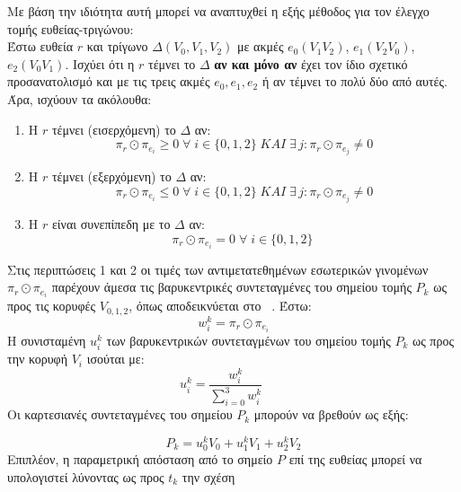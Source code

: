Με βάση την ιδιότητα αυτή μπορεί να αναπτυχθεί η εξής μέθοδος για τον έλεγχο τομής ευθείας-τριγώνου:\\

Έστω ευθεία $r$ και τρίγωνο $\Delta(V_0,V_1,V_2)$ με ακμές $e_0(V_1V_2)$, $e_1(V_2V_0)$, $e_2(V_0V_1)$. Ισχύει ότι η $r$ τέμνει το $\Delta$ \textbf{αν και μόνο αν} έχει τον ίδιο σχετικό προσανατολισμό και με τις τρεις ακμές $e_0,e_1,e_2$ ή αν τέμνει το πολύ δύο από αυτές. Άρα, ισχύουν τα ακόλουθα:

\begin{enumerate}
\item
Η $r$ τέμνει (εισερχόμενη) το $\Delta$ αν: \begin{equation*}\pi_r \odot \pi_{e_{i}} \geq 0\; \forall\; i\in \{0,1,2\}\; KAI \; \exists \,j : \pi_r \odot \pi_{e_{j}} \neq 0\end{equation*}
\item
Η $r$ τέμνει (εξερχόμενη) το $\Delta$ αν:\begin{equation*}\pi_r \odot \pi_{e_{i}} \leq 0\; \forall\; i\in \{0,1,2\}\;  KAI \; \exists \,j : \pi_r \odot \pi_{e_{j}} \neq 0 \end{equation*}
\item
Η $r$ είναι συνεπίπεδη με το $\Delta$ αν: \begin{equation}\pi_r \odot \pi_{e_{i}}= 0 \;\forall\; i\in \{0,1,2\}\; \label{eq:crit}  \end{equation}
\end{enumerate}

Στις περιπτώσεις 1 και 2 οι τιμές των αντιμετατεθημένων εσωτερικών γινομένων $\pi_r \odot \pi_{e_{i}}$ παρέχουν άμεσα τις βαρυκεντρικές συντεταγμένες του σημείου τομής $P_k$ ως προς τις κορυφές $V_{0,1,2}$, όπως αποδεικνύεται στο ~\cite{JonesIntersect}. Έστω:\\
\begin{equation}w^k_i=\pi_r \odot \pi_{e_{i}}
\label{eq:bary1} 
\end{equation}
H συνισταμένη $u^k_i$ των βαρυκεντρικών συντεταγμένων του σημείου τομής $P_k$ ως προς την κορυφή $V_i$ ισούται με:
\begin{equation}
u^k_i = \frac{w^k_i}{\displaystyle\sum_{i=0}^{3} w^k_i}  \qquad
\label{eq:bary2} 
\end{equation}
Οι καρτεσιανές συντεταγμένες του σημείου $P_k$ μπορούν να βρεθούν ως εξής:

\begin{equation}
P_k = u^k_0 V_0 + u^k_1 V_1 + u^k_2 V_2
\label{eq:cart} 
\end{equation}
Επιπλέον, η παραμετρική απόσταση από το σημείο $P$ επί της ευθείας μπορεί να υπολογιστεί λύνοντας ως προς $t_k$ την σχέση

